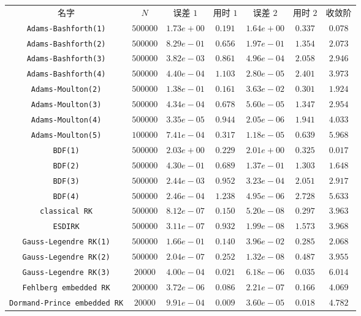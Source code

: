 \begin{tabular}{c|c|c|c|c|c|c}
名字&$N$&误差 $1$&用时 $1$&误差 $2$&用时 $2$&收敛阶\\
\texttt{Adams-Bashforth(1)}&$500000$&$1.73e+00$&$0.191$&$1.64e+00$&$0.337$&$0.078$\\
\texttt{Adams-Bashforth(2)}&$500000$&$8.29e-01$&$0.656$&$1.97e-01$&$1.354$&$2.073$\\
\texttt{Adams-Bashforth(3)}&$500000$&$3.82e-03$&$0.861$&$4.96e-04$&$2.058$&$2.946$\\
\texttt{Adams-Bashforth(4)}&$500000$&$4.40e-04$&$1.103$&$2.80e-05$&$2.401$&$3.973$\\
\texttt{Adams-Moulton(2)}&$500000$&$1.38e-01$&$0.161$&$3.63e-02$&$0.301$&$1.924$\\
\texttt{Adams-Moulton(3)}&$500000$&$4.34e-04$&$0.678$&$5.60e-05$&$1.347$&$2.954$\\
\texttt{Adams-Moulton(4)}&$500000$&$3.35e-05$&$0.944$&$2.05e-06$&$1.941$&$4.033$\\
\texttt{Adams-Moulton(5)}&$100000$&$7.41e-04$&$0.317$&$1.18e-05$&$0.639$&$5.968$\\
\texttt{BDF(1)}&$500000$&$2.03e+00$&$0.229$&$2.01e+00$&$0.325$&$0.017$\\
\texttt{BDF(2)}&$500000$&$4.30e-01$&$0.689$&$1.37e-01$&$1.303$&$1.648$\\
\texttt{BDF(3)}&$500000$&$2.44e-03$&$0.952$&$3.23e-04$&$2.051$&$2.917$\\
\texttt{BDF(4)}&$500000$&$2.46e-04$&$1.238$&$4.95e-06$&$2.728$&$5.633$\\
\texttt{classical RK}&$500000$&$8.12e-07$&$0.150$&$5.20e-08$&$0.297$&$3.963$\\
\texttt{ESDIRK}&$500000$&$3.11e-07$&$0.932$&$1.99e-08$&$1.573$&$3.968$\\
\texttt{Gauss-Legendre RK(1)}&$500000$&$1.66e-01$&$0.140$&$3.96e-02$&$0.285$&$2.068$\\
\texttt{Gauss-Legendre RK(2)}&$500000$&$2.04e-07$&$0.252$&$1.32e-08$&$0.487$&$3.955$\\
\texttt{Gauss-Legendre RK(3)}&$20000$&$4.00e-04$&$0.021$&$6.18e-06$&$0.035$&$6.014$\\
\texttt{Fehlberg embedded RK}&$200000$&$3.72e-06$&$0.086$&$2.21e-07$&$0.166$&$4.069$\\
\texttt{Dormand-Prince embedded RK}&$20000$&$9.91e-04$&$0.009$&$3.60e-05$&$0.018$&$4.782$\\
\end{tabular}
